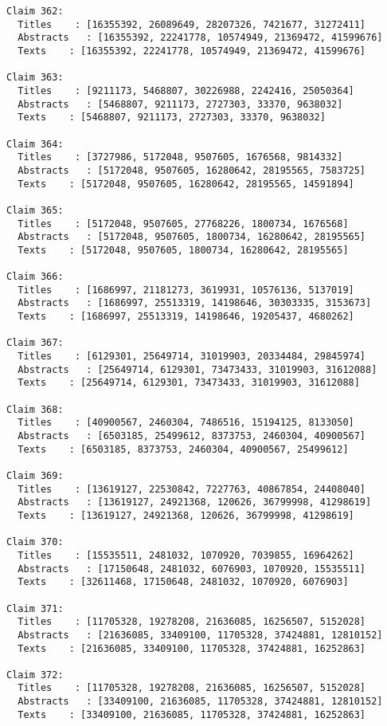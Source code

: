 \documentclass[11pt]{article}
\begin{document}
\begin{Verbatim}[commandchars=\\\{\}]
Claim 362:
  Titles    : [16355392, 26089649, 28207326, 7421677, 31272411]
  Abstracts   : [16355392, 22241778, 10574949, 21369472, 41599676]
  Texts    : [16355392, 22241778, 10574949, 21369472, 41599676]

Claim 363:
  Titles    : [9211173, 5468807, 30226988, 2242416, 25050364]
  Abstracts   : [5468807, 9211173, 2727303, 33370, 9638032]
  Texts    : [5468807, 9211173, 2727303, 33370, 9638032]

Claim 364:
  Titles    : [3727986, 5172048, 9507605, 1676568, 9814332]
  Abstracts   : [5172048, 9507605, 16280642, 28195565, 7583725]
  Texts    : [5172048, 9507605, 16280642, 28195565, 14591894]

Claim 365:
  Titles    : [5172048, 9507605, 27768226, 1800734, 1676568]
  Abstracts   : [5172048, 9507605, 1800734, 16280642, 28195565]
  Texts    : [5172048, 9507605, 1800734, 16280642, 28195565]

Claim 366:
  Titles    : [1686997, 21181273, 3619931, 10576136, 5137019]
  Abstracts   : [1686997, 25513319, 14198646, 30303335, 3153673]
  Texts    : [1686997, 25513319, 14198646, 19205437, 4680262]

Claim 367:
  Titles    : [6129301, 25649714, 31019903, 20334484, 29845974]
  Abstracts   : [25649714, 6129301, 73473433, 31019903, 31612088]
  Texts    : [25649714, 6129301, 73473433, 31019903, 31612088]

Claim 368:
  Titles    : [40900567, 2460304, 7486516, 15194125, 8133050]
  Abstracts   : [6503185, 25499612, 8373753, 2460304, 40900567]
  Texts    : [6503185, 8373753, 2460304, 40900567, 25499612]

Claim 369:
  Titles    : [13619127, 22530842, 7227763, 40867854, 24408040]
  Abstracts   : [13619127, 24921368, 120626, 36799998, 41298619]
  Texts    : [13619127, 24921368, 120626, 36799998, 41298619]

Claim 370:
  Titles    : [15535511, 2481032, 1070920, 7039855, 16964262]
  Abstracts   : [17150648, 2481032, 6076903, 1070920, 15535511]
  Texts    : [32611468, 17150648, 2481032, 1070920, 6076903]

Claim 371:
  Titles    : [11705328, 19278208, 21636085, 16256507, 5152028]
  Abstracts   : [21636085, 33409100, 11705328, 37424881, 12810152]
  Texts    : [21636085, 33409100, 11705328, 37424881, 16252863]

Claim 372:
  Titles    : [11705328, 19278208, 21636085, 16256507, 5152028]
  Abstracts   : [33409100, 21636085, 11705328, 37424881, 12810152]
  Texts    : [33409100, 21636085, 11705328, 37424881, 16252863]


\end{Verbatim}
\end{document}
